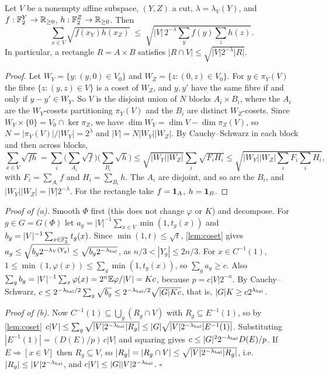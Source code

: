 \begin{lemma}\label{lem:coset}
Let $V$ be a nonempty affine subspace, $(Y,Z)$ a cut, $\lambda=\lambda_V(Y)$, and
$f:\mathbb{F}_2^Y\to\mathbb{R}_{\ge0}$, $h:\mathbb{F}_2^Z\to\mathbb{R}_{\ge0}$. Then
\[
\sum_{x\in V}\sqrt{f(x_Y)h(x_Z)}\;\le\;\sqrt{|V|\,2^{-\lambda}\textstyle\sum_yf(y)\sum_zh(z)}.
\]
In particular, a rectangle $R=A\times B$ satisfies $|R\cap V|\le\sqrt{|V|2^{-\lambda}|R|}$.
\end{lemma}

\begin{proof}
Let $W_Y=\{y:(y,0)\in V_0\}$ and $W_Z=\{z:(0,z)\in V_0\}$. For $y\in\pi_Y(V)$ the fibre
$\{z:(y,z)\in V\}$ is a coset of $W_Z$, and $y,y'$ have the same fibre if and only if
$y-y'\in W_Y$. So $V$ is the disjoint union of $N$ blocks $A_i\times B_i$, where the
$A_i$ are the $W_Y$-cosets partitioning $\pi_Y(V)$ and the $B_i$ are distinct
$W_Z$-cosets. Since $W_Y\times\{0\}=V_0\cap\ker\pi_Z$, we have $\dim W_Y=\dim
V-\dim\pi_Z(V)$, so $N=|\pi_Y(V)|/|W_Y|=2^\lambda$ and $|V|=N|W_Y||W_Z|$. By
Cauchy--Schwarz in each block and then across blocks,
\[
\sum_{x\in V}\sqrt{f h}=\sum_i\Big(\sum_{A_i}\sqrt f\Big)\Big(\sum_{B_i}\sqrt h\Big)
\le\sqrt{|W_Y||W_Z|}\sum_i\sqrt{F_iH_i}\le\sqrt{|W_Y||W_Z|\textstyle\sum_iF_i\sum_iH_i},
\]
with $F_i=\sum_{A_i}f$ and $H_i=\sum_{B_i}h$. The $A_i$ are disjoint, and so are the
$B_i$, and $|W_Y||W_Z|=|V|2^{-\lambda}$. For the rectangle take $f=\mathbf{1}_A$, $h=\mathbf{1}_B$.
\end{proof}

\emph{Proof of (a).} Smooth $\Phi$ first (this does not change $\varphi$ or $K$) and
decompose. For $g\in G=G(\Phi)$ let $a_g=|V|^{-1}\sum_{x\in V}\min(1,t_g(x))$ and
$b_g=|V|^{-1}\sum_{x\in\mathbb{F}_2^n}t_g(x)$. Since $\min(1,t)\le\sqrt t$, \cref{lem:coset}
gives $a_g\le\sqrt{b_g2^{-\lambda_V(Y_g)}}\le\sqrt{b_g2^{-\lambda_{\rm bal}}}$, as
$n/3<|Y_g|\le2n/3$. For $x\in C^{-1}(1)$, $1\le\min(1,\varphi(x))\le\sum_g\min(1,t_g(x))$,
so $\sum_ga_g\ge c$. Also $\sum_gb_g=|V|^{-1}\sum_x\varphi(x)=2^n\mathbb{E}\varphi/|V|=Kc$,
because $p=c|V|2^{-n}$. By Cauchy--Schwarz,
$c\le2^{-\lambda_{\rm bal}/2}\sum_g\sqrt{b_g}\le2^{-\lambda_{\rm bal}/2}\sqrt{|G|Kc}$,
that is, $|G|K\ge c2^{\lambda_{\rm bal}}$.

\emph{Proof of (b).} Now $C^{-1}(1)\subseteq\bigcup_g(R_g\cap V)$ with
$R_g\subseteq E^{-1}(1)$, so by \cref{lem:coset}
$c|V|\le\sum_g\sqrt{|V|2^{-\lambda_{\rm bal}}|R_g|}\le|G|\sqrt{|V|2^{-\lambda_{\rm
bal}}|E^{-1}(1)|}$. Substituting $|E^{-1}(1)|=(D(E)/p)\,c|V|$ and squaring gives
$c\le|G|^22^{-\lambda_{\rm bal}}D(E)/p$. If $E\Rightarrow[x\in V]$ then $R_g\subseteq V$,
so $|R_g|=|R_g\cap V|\le\sqrt{|V|2^{-\lambda_{\rm bal}}|R_g|}$, i.e.\
$|R_g|\le|V|2^{-\lambda_{\rm bal}}$, and $c|V|\le|G||V|2^{-\lambda_{\rm bal}}$.
\hfill$\square$

